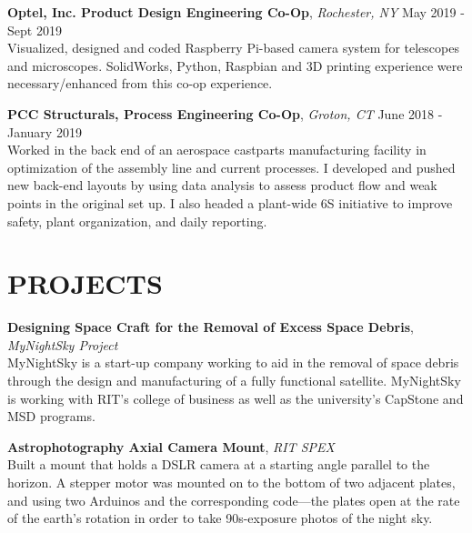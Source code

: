 \documentclass[line, resmargin]{res}
\begin{document}
\begin{resume}
\vspace{-7mm}

\textbf{Optel, Inc. Product Design Engineering Co-Op}, \textit{Rochester, NY} \hfill May 2019 - Sept 2019 \\
Visualized, designed and coded Raspberry Pi-based camera system for telescopes and microscopes. SolidWorks, Python, Raspbian and 3D printing experience were necessary/enhanced from this co-op experience.\\ 

\vspace{-7mm}

\textbf{PCC Structurals, Process Engineering Co-Op}, \textit{Groton, CT} \hfill June 2018 - January 2019 \\
Worked in the back end of an aerospace castparts manufacturing facility in optimization of the assembly line and current processes. I developed and pushed new back-end layouts by using data analysis to assess product flow and weak points in the original set up. I also headed a plant-wide 6S initiative to improve safety, plant organization, and daily reporting. 

\vspace{-2.5mm}

\section{PROJECTS}
\textbf{Designing Space Craft for the Removal of Excess Space Debris}, \textit{MyNightSky Project}\\
MyNightSky is a start-up company working to aid in the removal of space debris through the design and manufacturing of a fully functional satellite. MyNightSky is working with RIT’s college of business as well as the university’s CapStone and MSD programs.\\ 

\vspace{-7mm}

\textbf{Astrophotography Axial Camera Mount}, \textit{RIT SPEX}\\
Built a mount that holds a DSLR camera at a starting angle parallel to the horizon. A stepper motor was mounted on to the bottom of two adjacent plates, and using two Arduinos and the corresponding code—the plates open at the rate of the earth’s rotation in order to take 90s-exposure photos of the night sky.\\

\vspace{-7mm}


\end{resume}
\end{document}
